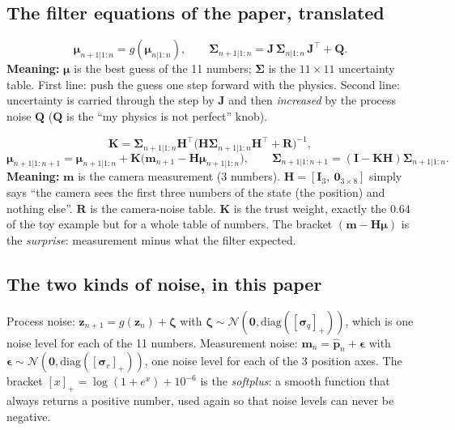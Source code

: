 \documentclass[11pt,a4paper]{article}
\begin{document}
\subsection{The filter equations of the paper, translated}
\begin{eqbox}
\[
\boldsymbol\mu_{n+1|1:n}=g(\boldsymbol\mu_{n|1:n}),\qquad
\boldsymbol\Sigma_{n+1|1:n}=\mathbf J\,\boldsymbol\Sigma_{n|1:n}\,\mathbf J^{\top}+\mathbf Q .
\]
\textbf{Meaning:} $\boldsymbol\mu$ is the best guess of the 11 numbers; $\boldsymbol\Sigma$ is the $11\times11$ uncertainty table.
First line: push the guess one step forward with the physics. Second line: uncertainty is
carried through the step by $\mathbf J$ and then \emph{increased} by the process noise $\mathbf Q$
($\mathbf Q$ is the ``my physics is not perfect'' knob).
\end{eqbox}

\begin{eqbox}
\[
\mathbf K=\boldsymbol\Sigma_{n+1|1:n}\mathbf H^{\top}\big(\mathbf H\boldsymbol\Sigma_{n+1|1:n}\mathbf H^{\top}+\mathbf R\big)^{-1},
\]
\[
\boldsymbol\mu_{n+1|1:n+1}=\boldsymbol\mu_{n+1|1:n}+\mathbf K\big(\mathbf m_{n+1}-\mathbf H\boldsymbol\mu_{n+1|1:n}\big),
\qquad
\boldsymbol\Sigma_{n+1|1:n+1}=(\mathbf I-\mathbf K\mathbf H)\boldsymbol\Sigma_{n+1|1:n}.
\]
\textbf{Meaning:} $\mathbf m$ is the camera measurement (3 numbers). $\mathbf H=[\mathbf I_3,\ \mathbf 0_{3\times8}]$
simply says ``the camera sees the first three numbers of the state (the position) and nothing
else''. $\mathbf R$ is the camera-noise table. $\mathbf K$ is the trust weight, exactly the
$0.64$ of the toy example but for a whole table of numbers. The bracket
$(\mathbf m-\mathbf H\boldsymbol\mu)$ is the \emph{surprise}: measurement minus what the filter expected.
\end{eqbox}

\subsection{The two kinds of noise, in this paper}
Process noise: $\mathbf z_{n+1}=g(\mathbf z_n)+\boldsymbol\zeta$ with $\boldsymbol\zeta\sim\mathcal N(\mathbf 0,\mathrm{diag}([\boldsymbol\sigma_q]_+))$,
which is one noise level for each of the 11 numbers. Measurement noise:
$\mathbf m_n=\hat{\mathbf p}_n+\boldsymbol\epsilon$ with $\boldsymbol\epsilon\sim\mathcal N(\mathbf 0,\mathrm{diag}([\boldsymbol\sigma_r]_+))$, one noise level for each of the 3 position axes. The
bracket $[x]_+=\log(1+e^x)+10^{-6}$ is the \emph{softplus}: a smooth function that always returns a positive
number, used again so that noise levels can never be negative.
\end{document}
